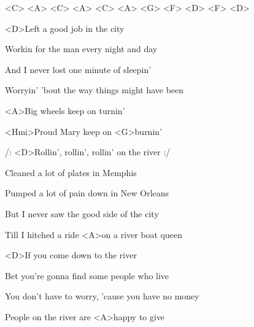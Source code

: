 

<C>
<A>
<C>
<A>
<C>
<A>
<G>
<F>
<D>
<F>
<D>

\zs
<D>Left a good job in the city

Workin for the man every night and day

And I never lost one minute of sleepin'

Worryin' 'bout the way things might have been
\ks

\zr
<A>Big wheels keep on turnin'

<Hmi>Proud Mary keep on <G>burnin'

/: <D>Rollin', rollin', rollin' on the river :/
\kr

\zs
Cleaned a lot of plates in Memphis

Pumped a lot of pain down in New Orleans

But I never saw the good side of the city

Till I hitched a ride <A>on a river boat queen
\ks

\zr
\kr

\zs
<D>If you come down to the river

Bet you're gonna find some people who live

You don't have to worry, 'cause you have no money

People on the river are <A>happy to give
\ks

\zr\kr

\kp
